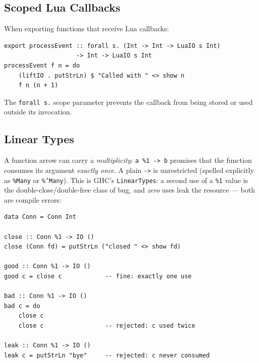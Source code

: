 \documentclass[11pt,a4paper]{article}
\begin{document}
\subsection{Scoped Lua Callbacks}

When exporting functions that receive Lua callbacks:

\begin{lstlisting}
export processEvent :: forall s. (Int -> Int -> LuaIO s Int)
                    -> Int -> LuaIO s Int
processEvent f n = do
    (liftIO . putStrLn) $ "Called with " <> show n
    f n (n + 1)
\end{lstlisting}

The \texttt{forall s.} scope parameter prevents the callback from being
stored or used outside its invocation.

\subsection{Linear Types}

A function arrow can carry a \emph{multiplicity}: \texttt{a \%1 -> b}
promises that the function consumes its argument \emph{exactly once}. A
plain \texttt{->} is unrestricted (spelled explicitly as \texttt{\%Many}
or \texttt{\%'Many}). This is GHC's \texttt{LinearTypes}: a second use
of a \texttt{\%1} value is the double-close/double-free class of bug,
and \emph{zero} uses leak the resource --- both are compile errors:

\begin{lstlisting}
data Conn = Conn Int

close :: Conn %1 -> IO ()
close (Conn fd) = putStrLn ("closed " <> show fd)

good :: Conn %1 -> IO ()
good c = close c            -- fine: exactly one use

bad :: Conn %1 -> IO ()
bad c = do
    close c
    close c                 -- rejected: c used twice

leak :: Conn %1 -> IO ()
leak c = putStrLn "bye"     -- rejected: c never consumed
\end{lstlisting}
\end{document}

